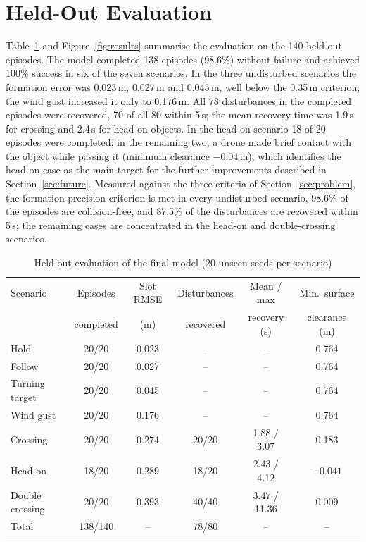 \section{Held-Out Evaluation}
Table~\ref{tab:results} and Figure~\ref{fig:results} summarise the evaluation on the 140 held-out episodes.
The model completed 138 episodes (98.6\%) without failure and achieved 100\% success in six of the seven
scenarios. In the three undisturbed scenarios the formation error was 0.023\,m, 0.027\,m and 0.045\,m, well
below the 0.35\,m criterion; the wind gust increased it only to 0.176\,m. All 78 disturbances in the completed
episodes were recovered, 70 of all 80 within 5\,s; the mean recovery time was 1.9\,s for crossing and 2.4\,s for
head-on objects. In the head-on scenario 18 of 20 episodes were completed; in the remaining two, a drone made brief
contact with the object while passing it (minimum clearance $-0.04$\,m), which identifies the
head-on case as the main target for the further improvements described in Section~\ref{sec:future}.
Measured against the three criteria of Section~\ref{sec:problem}, the formation-precision criterion is met in every
undisturbed scenario, 98.6\% of the episodes are collision-free, and 87.5\% of the disturbances are recovered
within 5\,s; the remaining cases are concentrated in the head-on and double-crossing scenarios.

\begin{table}[htbp]
\centering
\caption{Held-out evaluation of the final model (20 unseen seeds per scenario)}
\label{tab:results}
\small
\begin{tabular}{@{}lccccc@{}}
\toprule
Scenario & Episodes & Slot RMSE & Disturbances & Mean / max & Min.\ surface\\
 & completed & (m) & recovered & recovery (s) & clearance (m)\\
\midrule
Hold             & 20/20 & 0.023 & -- & -- & 0.764\\
Follow           & 20/20 & 0.027 & -- & -- & 0.764\\
Turning target   & 20/20 & 0.045 & -- & -- & 0.764\\
Wind gust        & 20/20 & 0.176 & -- & -- & 0.764\\
Crossing         & 20/20 & 0.274 & 20/20 & 1.88 / 3.07 & 0.183\\
Head-on          & 18/20 & 0.289 & 18/20 & 2.43 / 4.12 & $-0.041$\\
Double crossing  & 20/20 & 0.393 & 40/40 & 3.47 / 11.36 & 0.009\\
\midrule
Total            & 138/140 & -- & 78/80 & -- & --\\
\bottomrule
\end{tabular}
\end{table}

